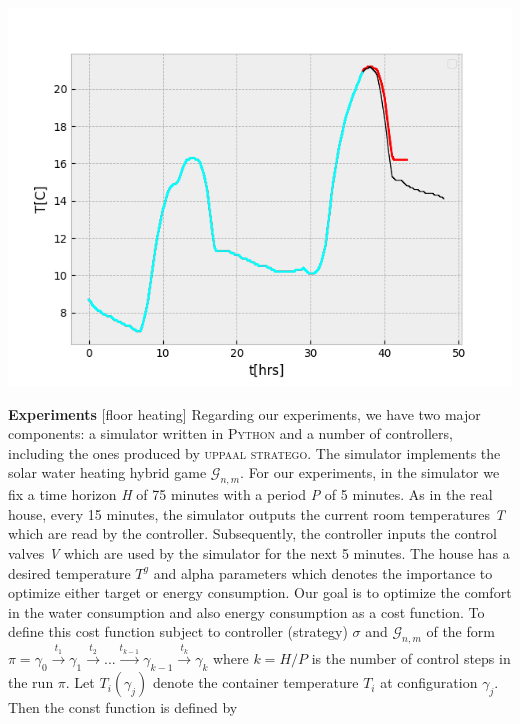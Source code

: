 \begin{minipage}{\linewidth}
    \begin{center}
        \includegraphics[width=0.8\linewidth]{images/prediction}
    \end{center}
\end{minipage}

\textbf{Experiments}
[floor heating]
Regarding our experiments, we have two major components: a simulator 
written in  \textsc{Python} and a number of controllers, including 
the ones produced by \textsc{uppaal stratego}. The simulator implements
the solar water heating hybrid game $\mathcal{G}_{n,m}$. For our 
experiments, in the simulator we fix a time horizon \emph{H} of 75 minutes
with a period \emph{P} of 5 minutes. As in the real house, every 
15 minutes, the simulator outputs the current room temperatures \emph{T}
which are read by the controller. Subsequently, the controller inputs
the control valves \emph{V} which are used by the simulator for the
next 5 minutes. The house has a desired temperature $T^g$ and alpha
parameters which denotes the importance to optimize either target or 
energy consumption. Our goal is to optimize the comfort in the water 
consumption and also energy consumption as a cost function. To define 
this cost function subject to controller (strategy) $\sigma$ and 
$\mathcal{G}_{n,m}$ of the form $\pi = \gamma_0 \xrightarrow{t_{1}} 
\gamma_1 \xrightarrow{t_{2}} ... \xrightarrow{t_{k-1}} 
\gamma_{k-1} \xrightarrow{t_{k}} \gamma_{k}$ where $k = H/P$ is the 
number of control steps in the run $\pi$. Let $T_{i}(\gamma_j)$ denote
the container temperature $T_i$ at configuration $\gamma_j$. Then the 
const function is defined by

